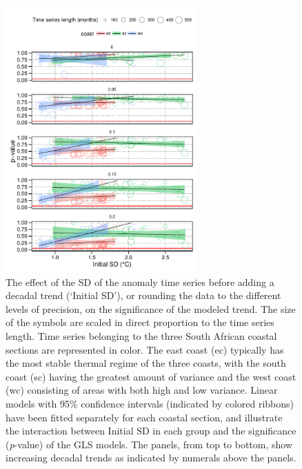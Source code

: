 \documentclass[]{ametsoc}
\begin{document}
\begin{figure}
\centering \includegraphics[width=0.65\textwidth]{figure05}
\caption{The effect of the SD of the anomaly time series before adding a decadal trend (`Initial SD'), or rounding the data to the different levels of precision, on the significance of the modeled trend. The size of the symbols are scaled in direct proportion to the time series length. Time series belonging to the three South African coastal sections are represented in color. The east coast (ec) typically has the most stable thermal regime of the three coasts, with the south coast (sc) having the greatest amount of variance and the west coast (wc) consisting of areas with both high and low variance. Linear models with 95\% confidence intervals (indicated by colored ribbons) have been fitted separately for each coastal section, and illustrate the interaction between Initial SD in each group and the significance (\emph{p}-value) of the GLS models. The panels, from top to bottom, show increasing decadal trends as indicated by numerals above the panels.}
\label{figure05}
\end{figure}
\end{document}

